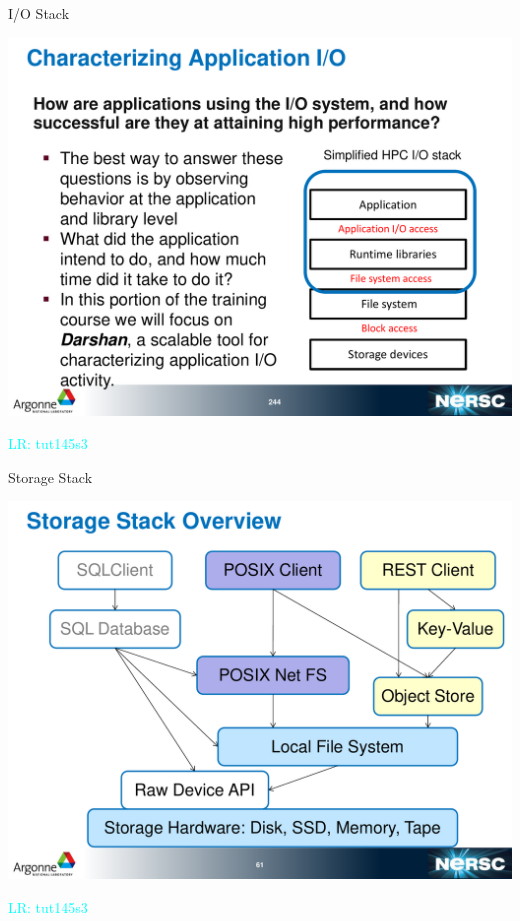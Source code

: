\documentclass[compress,11pt,xcolor=svgnames,aspectratio=169]{beamer}
\newcommand{\lr}[1]{\textcolor{cyan}{LR: #1}}
\begin{document}
\begin{frame}[t]{I/O Stack}

\begin{center}
\includegraphics[scale=0.3]{fig/io-stack3}
\end{center}

\lr{tut145s3}

\end{frame}

\begin{frame}[t]{Storage Stack}

\begin{center}
\includegraphics[scale=0.3]{fig/storage-stack}
\end{center}

\lr{tut145s3}

\end{frame}
\end{document}
